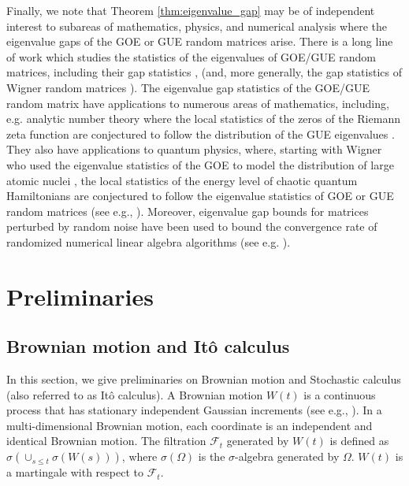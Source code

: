 \documentclass[11pt,letterpaper]{article}
\begin{document}
Finally, we note that Theorem \ref{thm:eigenvalue_gap} may be of independent interest to subareas of mathematics, physics, and numerical analysis where the eigenvalue gaps of the GOE or GUE random matrices arise.
%
 There is a long line of work which studies the statistics of the eigenvalues of GOE/GUE random matrices, including their gap statistics  \cite{ben2013extreme, feng2018large, feng2019small, forrester2018functional, giraud2022probing, bui2018gaps}, (and, more generally, the gap statistics of Wigner random matrices \cite{tao2013asymptotic, nguyen2017random}).
%
 The eigenvalue gap statistics of the GOE/GUE random matrix have applications to numerous areas of mathematics, including, e.g. analytic number theory where the local statistics of the zeros of the Riemann zeta function are conjectured to follow the distribution of the GUE eigenvalues \cite{montgomery1973pair, rudnick1996zeros, blomer2017small}.
%
   They also have applications to quantum physics, where, starting with Wigner who used the eigenvalue statistics of the GOE to model the distribution of large atomic nuclei \cite{Wigner_1956_report}, the local statistics of the energy level of chaotic quantum Hamiltonians are conjectured to follow the eigenvalue statistics of GOE or GUE random matrices  (see e.g., \cite{dyson1962statistical, bohigas1986spectral, guhr1998random, valko2014random, cotler2017chaos}). 
%
    Moreover, eigenvalue gap bounds for matrices perturbed by random noise have been used to bound the convergence rate of randomized numerical linear algebra algorithms (see e.g.  \cite{kulkarni2020random, peng2021solving, meyer2024unreasonable}).
\section{Preliminaries}

\subsection{Brownian motion and It\^o calculus}

In this section, we give preliminaries on Brownian motion and Stochastic calculus (also referred to as It\^o calculus).
%
A Brownian motion $W(t)$ is a continuous process that has stationary
independent Gaussian increments  (see e.g., \cite{morters2010brownian}).
%
In a multi-dimensional Brownian motion,  each coordinate is an independent and identical Brownian motion. 
%
The filtration $\mathcal{F}_t$  generated by  $W(t)$ is defined as $\sigma \left(\cup_{s \leq t} \sigma(W(s))\right)$, where $\sigma(\Omega)$ is the $\sigma$-algebra generated by $\Omega$.
%
$W(t)$ is a martingale with respect to $\mathcal{F}_t$.
\end{document}

